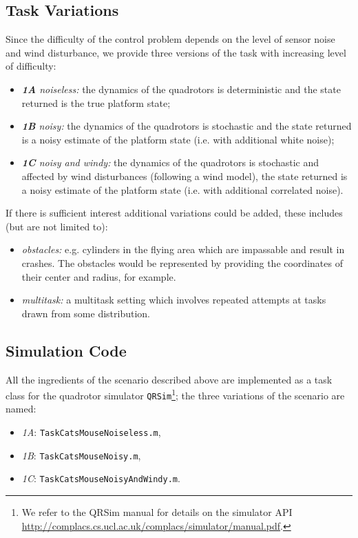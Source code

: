 \documentclass[a4paper,11pt]{report}
\newcommand{\webman}{\url{http://complacs.cs.ucl.ac.uk/complacs/simulator/manual.pdf}\xspace}
\newcommand\mytexttt[1]{\texttt{\hyphenchar\font=45\relax #1}}
\begin{document}
\subsection{Task Variations} \label{CatMouseVariations}
 Since the difficulty of the control problem depends on the level of sensor noise and wind disturbance, we provide three versions of the task with increasing level of difficulty:
\begin{itemize}
 \item \textit{\textbf{1A} noiseless:} the dynamics of the quadrotors is deterministic and the state returned is the true platform state;
 \item \textit{\textbf{1B} noisy:} the dynamics of the quadrotors is stochastic and the state returned is a noisy estimate of the platform state (i.e. with additional white noise);
 \item \textit{\textbf{1C} noisy and windy:} the dynamics of the quadrotors is stochastic and affected by wind disturbances (following a wind model), the state returned is a noisy estimate of the platform state (i.e. with additional correlated noise).
\end{itemize}

If there is sufficient interest additional variations could be added, these includes (but are not limited to):
\begin{itemize} 
\item \textit{obstacles:} e.g. cylinders in the flying area which are impassable and result in crashes. The obstacles would be represented by providing the coordinates of their center and radius, for example.
\item \textit{multitask:} a multitask setting which involves repeated attempts at tasks drawn from some distribution.
\end{itemize}


\subsection{Simulation Code}\label{CatMouseSim}
All the ingredients of the scenario described above are implemented as a task class for the quadrotor simulator \texttt{QRSim}\footnote{We refer to the QRSim manual for details on the simulator API \webman.}; the three variations of the scenario are named:
\begin{itemize}
\item\textit{1A}: \mytexttt{TaskCatsMouseNoiseless.m},
\item\textit{1B}: \mytexttt{TaskCatsMouseNoisy.m},
\item\textit{1C}: \mytexttt{TaskCatsMouseNoisyAndWindy.m}. 
\end{itemize}
\end{document}
